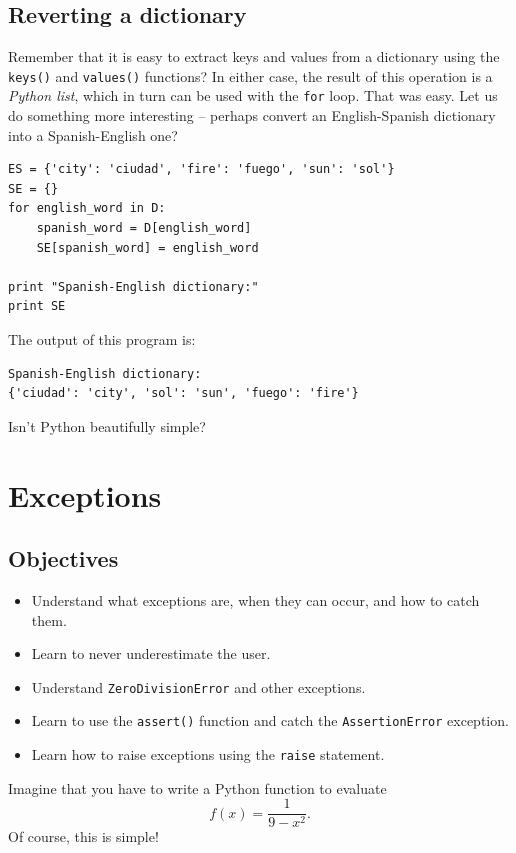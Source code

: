 \subsection{Reverting a dictionary}

Remember that it is easy to extract keys and values from a dictionary using the 
{\tt keys()} and {\tt values()} functions? In either case, the result of this operation 
is a {\em Python list}, which in turn can be used with the {\tt for} loop. That was easy. Let us do something more interesting -- 
perhaps convert an English-Spanish dictionary into a Spanish-English one? 

\begin{verbatim}
ES = {'city': 'ciudad', 'fire': 'fuego', 'sun': 'sol'}
SE = {}
for english_word in D:
    spanish_word = D[english_word]
    SE[spanish_word] = english_word
    
print "Spanish-English dictionary:"
print SE
\end{verbatim}
The output of this program is:

\begin{verbatim}
Spanish-English dictionary:
{'ciudad': 'city', 'sol': 'sun', 'fuego': 'fire'}
\end{verbatim}
Isn't Python beautifully simple?



\section{Exceptions}

\subsection{Objectives}

\begin{itemize}
\item Understand what exceptions are, when they can occur, and how to catch them.
\item Learn to never underestimate the user.
\item Understand {\tt ZeroDivisionError} and other exceptions.
\item Learn to use the {\tt assert()} function and catch the {\tt AssertionError} exception.
\item Learn how to raise exceptions using the {\tt raise} statement.
\end{itemize}
Imagine that you have to write a Python function to evaluate
$$
f(x) = \frac{1}{9 - x^2}.
$$
Of course, this is simple!

